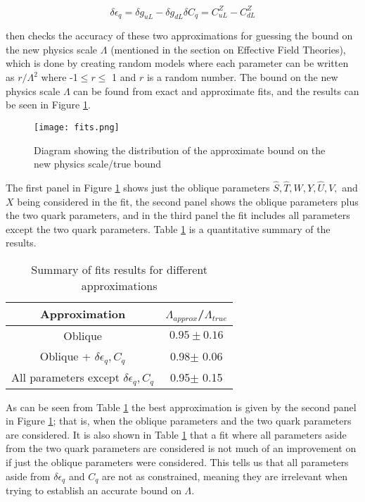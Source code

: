 \documentclass[11pt,oneside,a4paper]{article}
\begin{document}
\begin{equation}
\label{eq:quarkobs}
\delta\epsilon_{q} = \delta g_{uL} - \delta g_{dL}
\delta C_{q} = C^{Z}_{uL} - C^{Z}_{dL}
\end{equation}

\cite{EWprecision} then checks the accuracy of these two approximations for guessing the bound on the new physics scale $\Lambda$ (mentioned in the section on Effective Field Theories), which is done by creating random models where each parameter can be written as $r/\Lambda^{2}$ where -1$\leq r \leq$ 1 and $r$ is a random number. The bound on the new physics scale $\Lambda$ can be found from exact and approximate fits, and the results can be seen in Figure \ref{fig:fits}.\cite{EWprecision}


\begin{figure}[htbp]
    \texttt{[image: fits.png]}
    \centering
	\caption{Diagram showing the distribution of the approximate bound on the new physics scale/true bound}
	\label{fig:fits}
\end{figure}

The first panel in Figure \ref{fig:fits} shows just the oblique parameters $\hat{S}, \hat{T}, W, Y, \hat{U}, V,$ and $X$ being considered in the fit, the second panel shows the oblique parameters plus the two quark parameters, and in the third panel the fit includes all parameters except the two quark parameters. Table \ref{table:fits} is a quantitative summary of the results.

\begin{table}[h!]
	\begin{center}
		\begin{tabular}{|| c | c||} 
			\hline
		Approximation &  $\Lambda_{approx}$/$\Lambda_{true}$\\ [0.5ex] 
			\hline\hline
				Oblique & $0.95\pm 0.16$\\
			Oblique + $\delta\epsilon_{q}, C_{q}$ & 0.98$\pm$ 0.06\\ 
			All parameters except $\delta\epsilon_{q}, C_{q}$ & 0.95$\pm$ 0.15  \\ [1 ex] 
			\hline
		\end{tabular}
		\caption{Summary of fits results for different approximations}
		\label{table:fits}
	\end{center}
\end{table}

As can be seen from Table \ref{table:fits} the best approximation is given by the second panel in Figure \ref{fig:fits}; that is, when the oblique parameters and the two quark parameters are considered. It is also shown in Table \ref{table:fits} that a fit where all parameters aside from the two quark parameters are considered is not much of an improvement on if just the oblique parameters were considered. This tells us that all parameters aside from $\delta\epsilon_{q}$ and $C_{q}$ are not as constrained, meaning they are irrelevant when trying to establish an accurate bound on $\Lambda$. 
\end{document}
